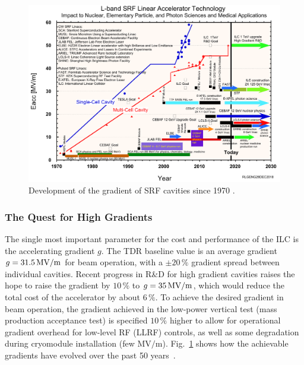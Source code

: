 \begin{figure}[tbhp]
   \includegraphics[width=0.8 \hsize]{chapters/figures/LBandSRFNbCavityGradientEvolution_ProjectImpact_rev28dec2018}
\caption{Development of the gradient of SRF cavities since 1970
\cite[updated]{Geng:2015glc}.
}
\label{fig:gradients}
\end{figure}

\subsubsection{The Quest for High Gradients}

The single most important parameter for the cost and performance of the ILC is the accelerating gradient $g$.
The TDR baseline value is an average gradient $g = 31.5\,{\mathrm{MV/m}}$ for beam operation, with a $\pm 20\,\%$ gradient spread between individual cavities.
Recent progress in R\&D for high gradient cavities raises the hope to raise the gradient by  $10\,\%$  to  $g = 35\,{\mathrm{MV/m}}$, which would reduce the total cost of the  accelerator by about  $6\,\%$.
To achieve the desired gradient in beam operation, the gradient achieved in the low-power vertical test (mass production acceptance test) is specified $10\,\%$ higher to allow for operational gradient overhead for low-level
RF (LLRF) controls, as well as some degradation during cryomodule installation (few ${\mathrm{MV/m}}$).
Fig.~\ref{fig:gradients} shows how the achievable gradients have evolved over the past 50 years~\cite{Geng:2015glc}.

